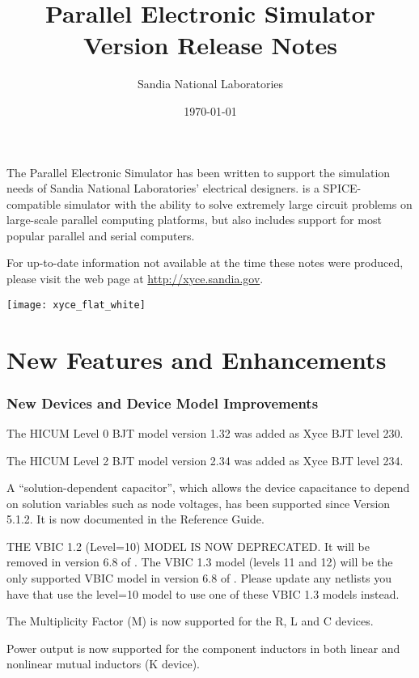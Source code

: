 \documentclass{article}
\title{\XyceTitle{} Parallel Electronic Simulator\\
Version \XyceVersionVar{} Release Notes}
\author{ Sandia National Laboratories}
\date{\today}
\begin{document}
\maketitle

The \XyceTM{} Parallel Electronic Simulator has been written to support the
simulation needs of Sandia National Laboratories' electrical designers.
\XyceTM{} is a SPICE-compatible simulator with the ability to solve extremely
large circuit problems on large-scale parallel computing platforms, but also
includes support for most popular parallel and serial computers.

For up-to-date information not available at the time these notes were produced,
please visit the \XyceTM{} web page at
{\color{XyceDeepRed}\url{http://xyce.sandia.gov}}.

\tableofcontents
\vspace*{\fill}
\parbox{\textwidth}
{
     \hfill
     \texttt{[image: xyce\_flat\_white]}
}


\newpage
\section{New Features and Enhancements}

\subsubsection*{New Devices and Device Model Improvements}
\begin{XyceItemize}
     \item The HICUM Level 0 BJT model version 1.32 was added as Xyce BJT level 230.
     \item The HICUM Level 2 BJT model version 2.34 was added as Xyce BJT level 234.
     \item A ``solution-dependent capacitor'', which allows the device
          capacitance to depend on solution variables such as node voltages,
          has been supported since \Xyce{} Version 5.1.2. It is now documented
          in the Reference Guide.
     \item THE VBIC 1.2 (Level=10) MODEL IS NOW DEPRECATED.  It will be removed
          in version 6.8 of \Xyce{}.  The VBIC 1.3 model (levels 11 and 12)
          will be the only supported VBIC model in version 6.8 of \Xyce{}.
          Please update any netlists you have that use the level=10 model to
          use one of these VBIC 1.3 models instead.
     \item The Multiplicity Factor (M) is now supported for the R, L and C devices.
     \item Power output is now supported for the component inductors in both
          linear and nonlinear mutual inductors (K device).
\end{XyceItemize}
\end{document}
